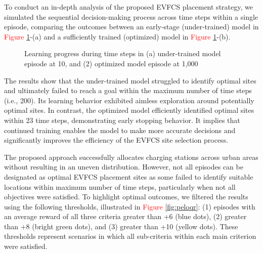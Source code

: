\documentclass[preprint,12pt]{elsarticle}
\begin{document}
To conduct an in-depth analysis of the proposed EVFCS placement strategy, we simulated the sequential decision-making process across time steps within a single episode, comparing the outcomes between an early-stage (under-trained) model in \textcolor{red}{Figure \ref{fig:lpdts}}-(a) and a sufficiently trained (optimized) model in \textcolor{red}{Figure \ref{fig:lpdts}}-(b). 

\begin{figure}[htb]
    \centering
    \qquad

    \captionsetup{format=plain, font=small, labelfont=bf}
    \caption{Learning progress during time steps in (a) under-trained model episode at 10, and (2) optimized model episode at 1,000}
    \label{fig:lpdts}
\end{figure}

The results show that the under-trained model struggled to identify optimal sites and ultimately failed to reach a goal within the maximum number of time steps (i.e., 200). Its learning behavior exhibited aimless exploration around potentially optimal sites. In contrast, the optimized model efficiently identified optimal sites within 23 time steps, demonstrating early stopping behavior. It implies that continued training enables the model to make more accurate decisions and significantly improves the efficiency of the EVFCS site selection process.  

\vspace{0.5cm}

The proposed approach successfully allocates charging stations across urban areas without resulting in an uneven distribution. However, not all episodes can be designated as optimal EVFCS placement sites as some failed to identify suitable locations within maximum number of time steps, particularly when not all objectives were satisfied. To highlight optimal outcomes, we filtered the results using the following thresholds, illustrated in \textcolor{red}{Figure \ref{fig:peloqr}}: (1) episodes with an average reward of all three criteria greater than +6 (blue dots), (2) greater than +8 (bright green dots), and (3) greater than +10 (yellow dots). These thresholds represent scenarios in which all sub-criteria within each main criterion were satisfied. 
\end{document}
